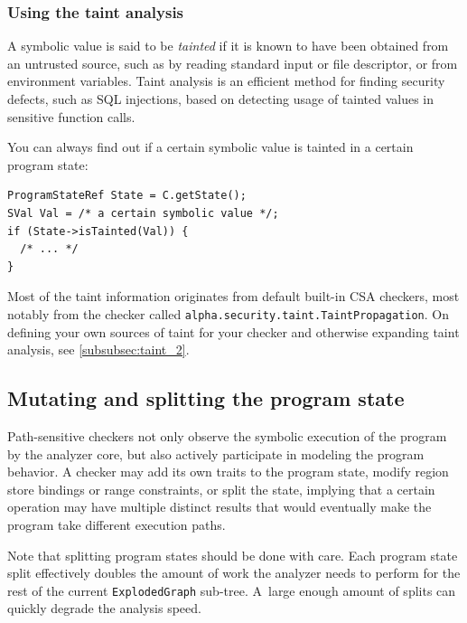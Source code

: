 \documentclass[a4paper,12pt]{article}
\newenvironment{nobr}{\begin{minipage}{\textwidth}\setlength\parskip{1em}
}{\end{minipage}\ignorespacesafterend}
\begin{document}
\subsubsection{Using the taint analysis}\label{subsubsec:taint_1}

A symbolic value is said to be \emph{tainted} if it is known to have been obtained from an untrusted source, such as by reading standard input or file descriptor, or from environment variables. Taint analysis is an efficient method for finding security defects, such as SQL injections, based on detecting usage of tainted values in sensitive function calls.

\begin{nobr}
You can always find out if a certain symbolic value is tainted in a certain program state:

\begin{lstlisting}[style=cplusplus,numbers=none]
ProgramStateRef State = C.getState();
SVal Val = /* a certain symbolic value */;
if (State->isTainted(Val)) {
  /* ... */
}
\end{lstlisting}
\end{nobr}

Most of the taint information originates from default built-in CSA checkers, most notably from the checker called \lstinline|alpha.security.taint.TaintPropagation|. On defining your own sources of taint for your check\-er and otherwise expanding taint analysis, see \ref{subsubsec:taint_2}.

\subsection{Mutating and splitting the program state}\label{subsec:program_state_2}

Path-sensitive checkers not only observe the symbolic execution of the program by the analyzer core, but also actively participate in modeling the program behavior. A checker may add its own traits to the program state, modify region store bindings or range constraints, or split the state, implying that a certain operation may have multiple distinct results that would eventually make the program take different execution paths.

Note that splitting program states should be done with care. Each program state split effectively doubles the amount of work the analyzer needs to perform for the rest of the current \lstinline|ExplodedGraph| sub-tree. A~large enough amount of splits can quickly degrade the analysis speed.
\end{document}
